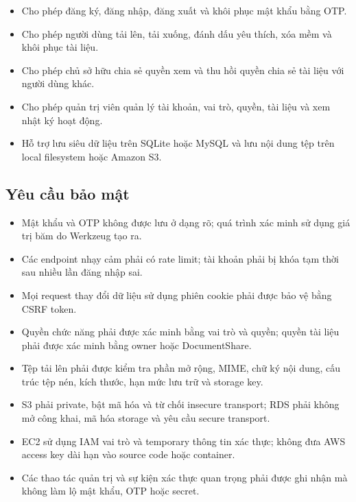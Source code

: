 \begin{itemize}
    \item Cho phép đăng ký, đăng nhập, đăng xuất và
    khôi phục mật khẩu bằng OTP.

    \item Cho phép người dùng tải lên, tải xuống,
    đánh dấu yêu thích, xóa mềm và khôi phục tài liệu.

    \item Cho phép chủ sở hữu chia sẻ quyền xem và
    thu hồi quyền chia sẻ tài liệu với người dùng khác.

    \item Cho phép quản trị viên quản lý tài khoản,
    vai trò, quyền, tài liệu và xem nhật ký hoạt động.

    \item Hỗ trợ lưu siêu dữ liệu trên SQLite hoặc MySQL
    và lưu nội dung tệp trên local filesystem
    hoặc Amazon S3.
\end{itemize}

\subsection{Yêu cầu bảo mật}

\begin{itemize}
    \item Mật khẩu và OTP không được lưu ở dạng rõ;
    quá trình xác minh sử dụng giá trị băm do
    Werkzeug tạo ra.

    \item Các endpoint nhạy cảm phải có rate limit;
    tài khoản phải bị khóa tạm thời sau nhiều lần
    đăng nhập sai.

    \item Mọi request thay đổi dữ liệu sử dụng
    phiên cookie phải được bảo vệ bằng CSRF token.

    \item Quyền chức năng phải được xác minh bằng
    vai trò và quyền; quyền tài liệu phải được
    xác minh bằng owner hoặc DocumentShare.

    \item Tệp tải lên phải được kiểm tra phần mở rộng,
    MIME, chữ ký nội dung, cấu trúc tệp nén, kích thước,
    hạn mức lưu trữ và storage key.

    \item S3 phải private, bật mã hóa và từ chối
    insecure transport; RDS phải không mở công khai,
    mã hóa storage và yêu cầu secure transport.

    \item EC2 sử dụng IAM vai trò và temporary thông tin xác thực;
    không đưa AWS access key dài hạn vào source code
    hoặc container.

    \item Các thao tác quản trị và sự kiện xác thực
    quan trọng phải được ghi nhận mà không làm lộ
    mật khẩu, OTP hoặc secret.
\end{itemize}

